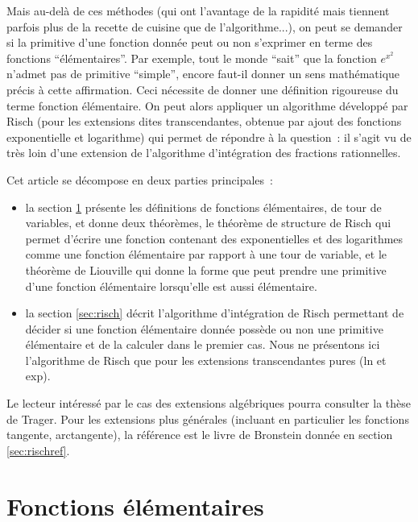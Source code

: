 \documentclass[a4paper,11pt]{book}
\begin{document}
\begin{giacjshere}
Mais au-delà de ces méthodes (qui ont l'avantage de la rapidité mais
tiennent parfois plus de la
recette de cuisine que de l'algorithme...), on peut se demander 
si la primitive d'une fonction donnée peut ou non s'exprimer en terme 
des fonctions ``élémentaires''. Par exemple, tout le monde ``sait''
que la fonction $e^{x^2}$ n'admet pas de primitive ``simple'', encore
faut-il donner un sens mathématique précis à cette affirmation.
Ceci nécessite de donner une définition rigoureuse du terme fonction
élémentaire. On peut alors appliquer un algorithme développé
par Risch (pour les extensions dites transcendantes, obtenue par ajout
des fonctions exponentielle et logarithme)  
qui permet de répondre à la question~:
il s'agit vu de très loin d'une extension de l'algorithme d'intégration
des fractions rationnelles.

Cet article se décompose en deux parties principales~:
\begin{itemize}
\item la section \ref{sec:elem} présente les définitions de fonctions
élémentaires, de tour de variables, et donne deux théorèmes,
le théorème de structure de Risch qui permet d'écrire une fonction 
contenant des exponentielles et des logarithmes comme une fonction 
élémentaire par rapport à une tour de variable, et 
le théorème de Liouville qui donne la forme que peut prendre
une primitive d'une fonction élémentaire lorsqu'elle est aussi élémentaire.
\item la section \ref{sec:risch} décrit l'algorithme d'intégration de Risch
permettant de décider si une fonction élémentaire donnée possède
ou non une primitive élémentaire et de la calculer dans le premier
cas. Nous ne présentons ici l'algorithme de Risch que pour les extensions
transcendantes pures (ln et exp).
\end{itemize}
Le lecteur intéressé par le cas des extensions algébriques 
pourra consulter la thèse de Trager. Pour les extensions
plus g\'en\'erales (incluant en particulier les fonctions
tangente, arctangente), la r\'ef\'erence est le livre de Bronstein 
donnée en section \ref{sec:rischref}.

\section{Fonctions élémentaires} \label{sec:elem}


\end{giacjshere}
\end{document}
